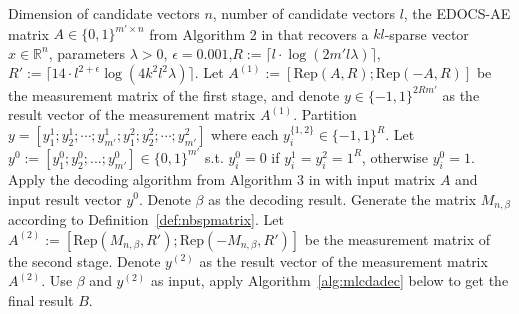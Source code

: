 \documentclass[10pt,a4paper]{amsart}
\begin{document}

\begin{algorithm}
\caption{Two-stage scheme of the MLC under Assumption~\ref{Assumption1}: Overall description}\label{alg:2SUMLC}
\begin{algorithmic}[1]
    \Require Dimension of candidate vectors $n$, number of candidate vectors $l$, the EDOCS-AE matrix $A\in \{0,1\}^{m'\times n}$ from Algorithm 2 in \cite{li2025support} that recovers a $kl$-sparse vector $x\in \mathbb{R}^n$, parameters $\lambda>0$, $\epsilon=0.001$,$R:=\lceil l\cdot \log(2m'l\lambda)\rceil$, $R':=\lceil 14\cdot l^{2+\epsilon}\log(4k^2l^2\lambda)\rceil$.
    \State Let $A^{(1)}:=[\mathrm{Rep}(A,R);\mathrm{Rep}(-A,R)]$ be the measurement matrix of the first stage, and denote $y\in\{-1,1\}^{2Rm'}$ as the result vector of the measurement matrix $A^{(1)}$. Partition $y=[y_1^1;y_2^1;\cdots;y_{m'}^1;
   y_1^2;y_2^2;\cdots;y_{m'}^2]$ where each $y_i^{\{1,2\}}\in \{-1,1\}^R$. Let $y^0:=[y_1^0;y_2^0;...;y_{m'}^0]\in\{0,1\}^{m'}$ s.t. $y_i^0=0$ if $y_i^1=y_i^2=1^R$, otherwise $y_i^0=1$. 
    \State Apply the decoding algorithm from Algorithm 3 in \cite{li2025support} with input matrix $A$ and input result vector $y^0$. Denote $\beta$ as the decoding result.
    \State Generate the matrix $M_{n,\beta}$ according to Definition~\ref{def:nbspmatrix}. 
    \State Let $A^{(2)}:=[\mathrm{Rep}(M_{n,\beta},R');\mathrm{Rep}(-M_{n,\beta},R')]$ be the measurement matrix of the second stage. 
    \State Denote $y^{(2)}$ as the result vector of the measurement matrix $A^{(2)}$. 
    \State Use $\beta$ and $y^{(2)}$ as input, apply Algorithm~\ref{alg:mlcdadec} below to get the final result $B$. 

\end{algorithmic}
\end{algorithm}
\end{document}
